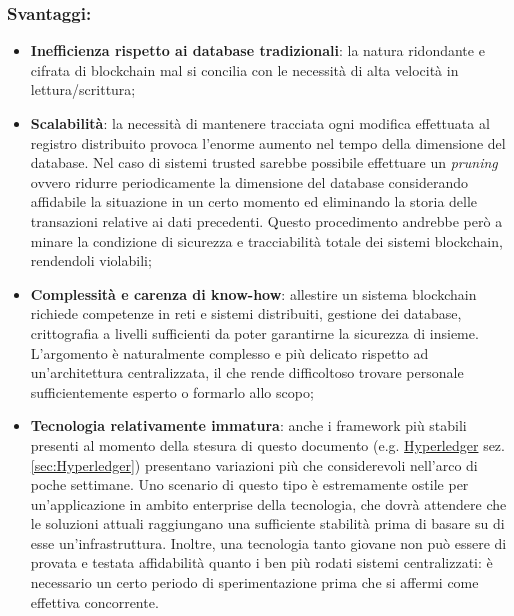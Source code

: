 		\subsubsection{Svantaggi:}
			\begin{itemize}
				\item \textbf{Inefficienza rispetto ai database tradizionali}: la natura ridondante e cifrata di blockchain mal si concilia con le necessità di alta velocità in lettura/scrittura;
				\item \textbf{Scalabilità}: la necessità di mantenere tracciata ogni modifica effettuata al registro distribuito provoca l'enorme aumento nel tempo della dimensione del database. Nel caso di sistemi trusted sarebbe possibile effettuare un \emph{pruning}\label{pruning} ovvero ridurre periodicamente la dimensione del database considerando affidabile la situazione in un certo momento ed eliminando la storia delle transazioni relative ai dati precedenti. Questo procedimento andrebbe però a minare la condizione di sicurezza e tracciabilità totale dei sistemi blockchain, rendendoli violabili;
				\item \textbf{Complessità e carenza di know-how}: allestire un sistema blockchain richiede competenze in reti e sistemi distribuiti, gestione dei database, crittografia a livelli sufficienti da poter garantirne la sicurezza di insieme. L'argomento è naturalmente complesso e più delicato rispetto ad un'architettura centralizzata, il che rende difficoltoso trovare personale sufficientemente esperto o formarlo allo scopo;
				\item \textbf{Tecnologia relativamente immatura}: anche i framework più stabili presenti al momento della stesura di questo documento (e.g. \hyperref[sec:Hyperledger]{Hyperledger} sez. \ref{sec:Hyperledger}) presentano variazioni più che considerevoli nell'arco di poche settimane. Uno scenario di questo tipo è estremamente ostile per un'applicazione in ambito enterprise della tecnologia, che dovrà attendere che le soluzioni attuali raggiungano una sufficiente stabilità prima di basare su di esse un'infrastruttura. Inoltre, una tecnologia tanto giovane non può essere di provata e testata affidabilità quanto i ben più rodati sistemi centralizzati: è necessario un certo periodo di sperimentazione prima che si affermi come effettiva concorrente.
			\end{itemize}
		

